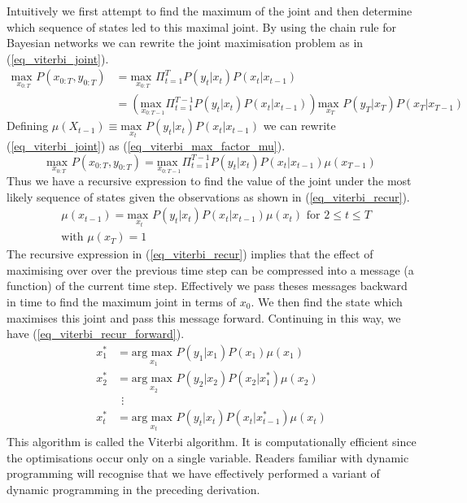 Intuitively we first attempt to find the maximum of the joint and then determine which sequence of states led to this maximal joint. By using the chain rule for Bayesian networks we can rewrite the joint maximisation problem as in (\ref{eq_viterbi_joint}).
\begin{equation}
\begin{aligned}
\underset{x_{0:T}}{\text{max }} P(x_{0:T}, y_{0:T}) &= \underset{x_{0:T}}{\text{max }} \Pi_{t=1}^T P(y_t|x_t) P(x_t|x_{t-1})\\
&= \left(\underset{x_{0:T-1}}{\text{max }} \Pi_{t=1}^{T-1} P(y_t|x_t) P(x_t|x_{t-1}) \right) \underset{x_{T}}{\text{max }} P(y_T|x_T) P(x_T|x_{T-1})
\end{aligned}
\label{eq_viterbi_joint}
\end{equation}
Defining $\mu(X_{t-1}) \equiv \underset{x_{t}}{\text{max }} P(y_t|x_t) P(x_t|x_{t-1})$ we can rewrite (\ref{eq_viterbi_joint}) as (\ref{eq_viterbi_max_factor_mu}).
\begin{equation}
\underset{x_{0:T}}{\text{max }} P(x_{0:T}, y_{0:T}) =\underset{x_{0:T-1}}{\text{max }} \Pi_{t=1}^{T-1} P(y_t|x_t) P(x_t|x_{t-1}) \mu(x_{T-1})
\label{eq_viterbi_max_factor_mu}
\end{equation}
Thus we have a recursive expression to find the value of the joint under the most likely sequence of states given the observations as shown in (\ref{eq_viterbi_recur}).
\begin{equation}
\begin{aligned}
&\mu(x_{t-1}) = \underset{x_{t}}{\text{max }} P(y_t|x_t) P(x_t|x_{t-1}) \mu(x_t) \text{ for } 2 \leq t \leq T \\
&\text{with } \mu(x_T) = 1 
\end{aligned}
\label{eq_viterbi_recur}
\end{equation}
The recursive expression in (\ref{eq_viterbi_recur}) implies that the effect of maximising over over the previous time step can be compressed into a message (a function) of the current time step. Effectively we pass theses messages backward in time to find the maximum joint in terms of $x_0$. We then find the state which maximises this joint and pass this message forward.  Continuing in this way, we have (\ref{eq_viterbi_recur_forward}).
\begin{equation}
\begin{aligned}
x_1^* &= \underset{x_{1}}{\text{arg max }}P(y_1|x_1)P(x_1)\mu(x_1) \\
x_2^* &= \underset{x_{2}}{\text{arg max }}P(y_2|x_2)P(x_2|x_1^*)\mu(x_2) \\
&~~\vdots \\
x_t^* &= \underset{x_{t}}{\text{arg max }}P(y_t|x_t)P(x_t|x_{t-1}^*)\mu(x_t)
\end{aligned}
\label{eq_viterbi_recur_forward}
\end{equation}
This algorithm is called the Viterbi algorithm. It is computationally efficient since the optimisations occur only on a single variable. Readers familiar with dynamic programming will recognise that we have effectively performed a variant of dynamic programming in the preceding derivation.

